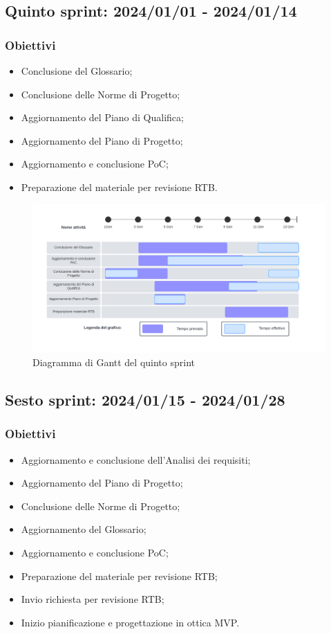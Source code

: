 \subsection{Quinto sprint: 2024/01/01 - 2024/01/14}
\subsubsection{Obiettivi}
\begin{itemize}
    \item Conclusione del Glossario;
    \item Conclusione delle Norme di Progetto;
    \item Aggiornamento del Piano di Qualifica;
    \item Aggiornamento del Piano di Progetto;
    \item Aggiornamento e conclusione PoC;
    \item Preparazione del materiale per revisione RTB.
\end{itemize}

\begin{figure}[h!]
    \centering  
    \includegraphics[width=\textwidth]{Roadmap5sprint.png}
    \caption{Diagramma di Gantt del quinto sprint}
    \label{fig:roadmap5s}
\end{figure}
\newpage

\subsection{Sesto sprint: 2024/01/15 - 2024/01/28}
\subsubsection{Obiettivi}
\begin{itemize}
    \item Aggiornamento e conclusione dell'Analisi dei requisiti;
    \item Aggiornamento del Piano di Progetto;
    \item Conclusione delle Norme di Progetto;
    \item Aggiornamento del Glossario;
    \item Aggiornamento e conclusione PoC;
    \item Preparazione del materiale per revisione RTB;
    \item Invio richiesta per revisione RTB;
    \item Inizio pianificazione e progettazione in ottica MVP.
\end{itemize}

